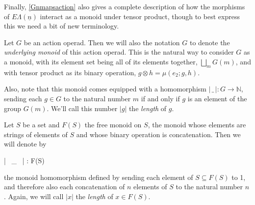 \documentclass{amsbook} %
\newcommand{\ELn}{E\Lambda(\underline{n})}
\newenvironment{eq*}{\begin{equation*}}{\end{equation*}}
\numberwithin{section}{chapter}
\begin{document}
Finally, \cref{Gnmapsaction} also gives a complete description of how the morphisms of $\ELn$ interact as a monoid under tensor product, though to best express this we need a bit of new terminology.

\begin{Defi} Let $G$ be an action operad. Then we will also the notation $G$ to denote the \emph{underlying monoid} of this action operad. This is the natural way to consider $G$ as a monoid, with its element set being all of its elements together, $\bigsqcup_m G(m)$, and with tensor product as its binary operation, $g \otimes h = \mu(e_2; g, h)$.

Also, note that this monoid comes equipped with a homomorphism $| \, \_ \, | : G \to \mathbb{N}$, sending each $g \in G$ to the natural number $m$ if and only if $g$ is an element of the group $G(m)$. We'll call this number $|g|$ the \emph{length} of $g$.
\end{Defi}

\begin{Defi}\label{lengthdef} Let $S$ be a set and $F(S)$ the free monoid on $S$, the monoid whose elements are strings of elements of $S$ and whose binary operation is concatenation. Then we will denote by
\begin{eq*} | \, \_ \, | : F(S) \to {} \end{eq*}
the monoid homomorphism defined by sending each element of $S \subseteq F(S)$ to 1, and therefore also each concatenation of $n$ elements of $S$ to the natural number $n$. Again, we will call $|x|$ the \emph{length} of $x \in F(S)$.
\end{Defi}
\end{document}
